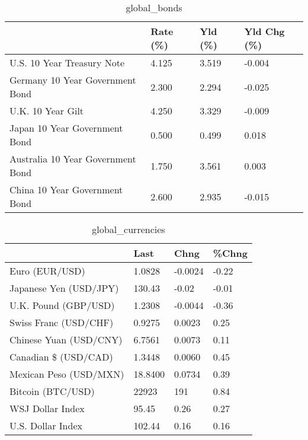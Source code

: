 \documentclass{article}%
\begin{document}
%


\begin{table}[htbp]%
\caption{global\_bonds}%
\centering%
\begin{adjustbox}{width=1\textwidth}%
\begin{tabular}{llll}
\toprule
                                  & Rate (\%) & Yld (\%) & Yld Chg (\%) \\
\midrule
       U.S. 10 Year Treasury Note &    4.125 &   3.519 &      -0.004 \\
  Germany 10 Year Government Bond &    2.300 &   2.294 &      -0.025 \\
                U.K. 10 Year Gilt &    4.250 &   3.329 &      -0.009 \\
    Japan 10 Year Government Bond &    0.500 &   0.499 &       0.018 \\
Australia 10 Year Government Bond &    1.750 &   3.561 &       0.003 \\
    China 10 Year Government Bond &    2.600 &   2.935 &      -0.015 \\
\bottomrule
\end{tabular}
%
\end{adjustbox}%
\end{table}

%


\begin{table}[htbp]%
\caption{global\_currencies}%
\centering%
\begin{adjustbox}{width=1\textwidth}%
\begin{tabular}{llll}
\toprule
                       &    Last &    Chng & \%Chng \\
\midrule
        Euro (EUR/USD) &  1.0828 & -0.0024 & -0.22 \\
Japanese Yen (USD/JPY) &  130.43 &   -0.02 & -0.01 \\
  U.K. Pound (GBP/USD) &  1.2308 & -0.0044 & -0.36 \\
 Swiss Franc (USD/CHF) &  0.9275 &  0.0023 &  0.25 \\
Chinese Yuan (USD/CNY) &  6.7561 &  0.0073 &  0.11 \\
  Canadian \$ (USD/CAD) &  1.3448 &  0.0060 &  0.45 \\
Mexican Peso (USD/MXN) & 18.8400 &  0.0734 &  0.39 \\
     Bitcoin (BTC/USD) &   22923 &     191 &  0.84 \\
      WSJ Dollar Index &   95.45 &    0.26 &  0.27 \\
     U.S. Dollar Index &  102.44 &    0.16 &  0.16 \\
\bottomrule
\end{tabular}
%
\end{adjustbox}%
\end{table}
\end{document}
